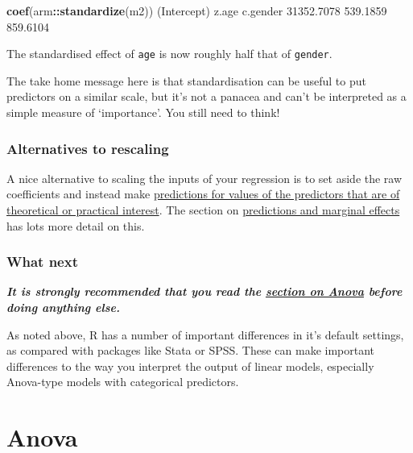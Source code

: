 \documentclass[]{article}
\newenvironment{Shaded}{\begin{snugshade}}{\end{snugshade}}
\newcommand{\FloatTok}[1]{\textcolor[rgb]{0.00,0.00,0.81}{#1}}
\newcommand{\KeywordTok}[1]{\textcolor[rgb]{0.13,0.29,0.53}{\textbf{#1}}}
\newcommand{\NormalTok}[1]{#1}
\newcommand{\OperatorTok}[1]{\textcolor[rgb]{0.81,0.36,0.00}{\textbf{#1}}}
\begin{document}
\begin{Shaded}
\begin{Highlighting}[]
\KeywordTok{coef}\NormalTok{(arm}\OperatorTok{::}\KeywordTok{standardize}\NormalTok{(m2))}
\NormalTok{(Intercept)       z.age    c.gender }
 \FloatTok{31352.7078}    \FloatTok{539.1859}    \FloatTok{859.6104} 
\end{Highlighting}
\end{Shaded}

The standardised effect of \texttt{age} is now roughly half that of \texttt{gender}.

{The take home message here is that standardisation can be useful to put
predictors on a similar scale, but it's not a panacea and can't be interpreted
as a simple measure of `importance'. You still need to think!}

\hypertarget{alternatives-to-rescaling}{%
\subsubsection*{Alternatives to rescaling}\label{alternatives-to-rescaling}}

A nice alternative to scaling the inputs of your regression is to set aside the
raw coefficients and instead make
\protect\hyperlink{predictions-and-margins}{predictions for values of the predictors that are of theoretical or practical interest}.
The section on \protect\hyperlink{predictions-and-margins}{predictions and marginal effects} has
lots more detail on this.

\hypertarget{what-next}{%
\subsubsection*{What next}\label{what-next}}

\textbf{\emph{It is strongly recommended that you read the \href{anova.html}{section on Anova}
before doing anything else.}}

As noted above, R has a number of important differences in it's default
settings, as compared with packages like Stata or SPSS. These can make important
differences to the way you interpret the output of linear models, especially
Anova-type models with categorical predictors.

\hypertarget{anova}{%
\section{Anova}\label{anova}}
\end{document}

